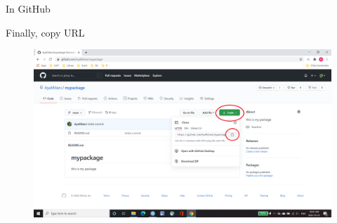 \documentclass[
  ignorenonframetext,
]{beamer}
\begin{document}
\begin{frame}{In GitHub}
\protect\hypertarget{in-github-4}{}

Finally, copy URL

\begin{figure}
  \includegraphics[scale=0.275]{slides_files/figure-beamer/GitHub_step5.png}
\end{figure}

\end{frame}
\end{document}
